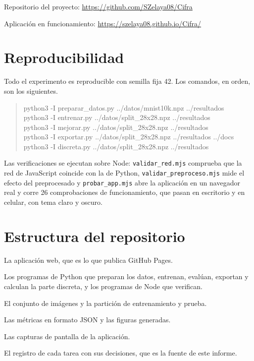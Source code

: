 \documentclass[12pt,letterpaper]{article}
\begin{document}
\vspace{0.6em}
\noindent Repositorio del proyecto: \url{https://github.com/SZelaya08/Cifra}

\noindent Aplicación en funcionamiento: \url{https://szelaya08.github.io/Cifra/}

\appendix

\section{Reproducibilidad}

Todo el experimento es reproducible con semilla fija 42. Los comandos, en orden, son
los siguientes.

\begin{quote}\ttfamily\small
python3 -I preparar\_datos.py ../datos/mnist10k.npz ../resultados\\
python3 -I entrenar.py ../datos/split\_28x28.npz ../resultados\\
python3 -I mejorar.py ../datos/split\_28x28.npz ../resultados\\
python3 -I exportar.py ../datos/split\_28x28.npz ../resultados ../docs\\
python3 -I discreta.py ../datos/split\_28x28.npz ../resultados
\end{quote}

Las verificaciones se ejecutan sobre Node: \texttt{validar\_red.mjs} comprueba que la
red de JavaScript coincide con la de Python, \texttt{validar\_preproceso.mjs} mide el
efecto del preprocesado y \texttt{probar\_app.mjs} abre la aplicación en un navegador
real y corre 26 comprobaciones de funcionamiento, que pasan en escritorio y en
celular, con tema claro y oscuro.

\section{Estructura del repositorio}

\begin{description}[leftmargin=2.6em,style=nextline,itemsep=3pt,font=\ttfamily]
\item[docs] La aplicación web, que es lo que publica GitHub Pages.
\item[codigo] Los programas de Python que preparan los datos, entrenan, evalúan,
  exportan y calculan la parte discreta, y los programas de Node que verifican.
\item[datos] El conjunto de imágenes y la partición de entrenamiento y prueba.
\item[resultados] Las métricas en formato JSON y las figuras generadas.
\item[capturas] Las capturas de pantalla de la aplicación.
\item[BITACORA.md] El registro de cada tarea con sus decisiones, que es la fuente de
  este informe.
\end{description}
\end{document}
